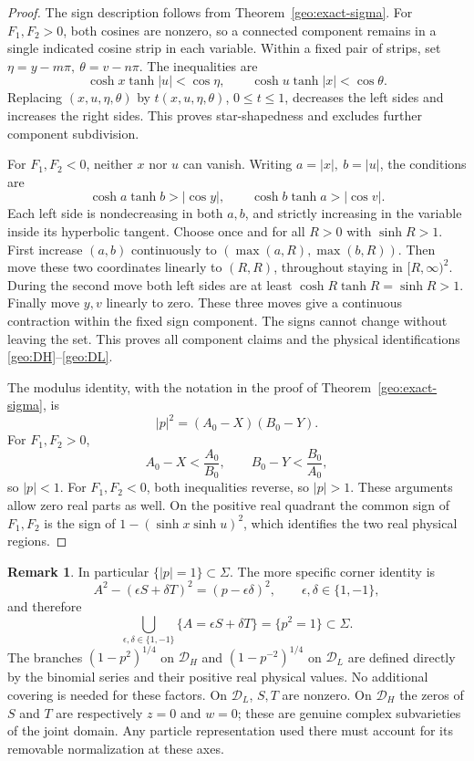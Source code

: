\documentclass[11pt]{article}
\numberwithin{equation}{section}
\theoremstyle{definition}
\newtheorem{remark}[theorem]{Remark}
\renewcommand{\DH}{\mathcal D_H}
\newcommand{\DL}{\mathcal D_L}
\begin{document}
\begin{proof}
The sign description follows from Theorem~\ref{geo:exact-sigma}.
For \(F_1,F_2>0\), both cosines are nonzero, so a connected
component remains in a single indicated cosine strip in each
variable.  Within a fixed pair of strips, set
\(\eta=y-m\pi,\ \theta=v-n\pi\).  The inequalities are
\[
 \cosh x\tanh|u|<\cos\eta,\qquad
 \cosh u\tanh|x|<\cos\theta.
\]
Replacing \((x,u,\eta,\theta)\) by
\(t(x,u,\eta,\theta)\), \(0\leq t\leq1\), decreases the
left sides and increases the right sides.  This proves
star-shapedness and excludes further component subdivision.

For \(F_1,F_2<0\), neither \(x\) nor \(u\) can vanish.
Writing \(a=|x|,\ b=|u|\), the conditions are
\[
 \cosh a\tanh b>|\cos y|,\qquad
 \cosh b\tanh a>|\cos v|.
\]
Each left side is nondecreasing in both \(a,b\), and strictly
increasing in the variable inside its hyperbolic tangent.
Choose once and for all \(R>0\) with \(\sinh R>1\).
First increase \((a,b)\) continuously to
\((\max(a,R),\max(b,R))\).  Then move these two coordinates
linearly to \((R,R)\), throughout staying in \([R,\infty)^2\).
During the second move both left sides are at least
\(\cosh R\tanh R=\sinh R>1\).  Finally move \(y,v\) linearly
to zero.  These three moves give a continuous contraction
within the fixed sign component.  The signs cannot change
without leaving the set.  This proves all component claims
and the physical identifications \eqref{geo:DH}--\eqref{geo:DL}.

The modulus identity, with the notation in the proof of
Theorem~\ref{geo:exact-sigma}, is
\begin{equation}\label{geo:p-modulus}
                  |p|^2=(A_0-X)(B_0-Y).
\end{equation}
For \(F_1,F_2>0\),
\[
 A_0-X<\frac{A_0}{B_0},\qquad
 B_0-Y<\frac{B_0}{A_0},
\]
so \(|p|<1\).  For \(F_1,F_2<0\), both inequalities reverse,
so \(|p|>1\).  These arguments allow zero real parts as well.
On the positive real quadrant the common sign of \(F_1,F_2\)
is the sign of \(1-(\sinh x\sinh u)^2\), which identifies the two
real physical regions.
\end{proof}

\begin{remark}\label{geo:algebraic-branches}
In particular \(\{|p|=1\}\subset\Sigma\).  The more specific
corner identity is
\[
 A^2-(\epsilon S+\delta T)^2=(p-\epsilon\delta)^2,
 \qquad \epsilon,\delta\in\{1,-1\},
\]
and therefore
\[
 \bigcup_{\epsilon,\delta\in\{1,-1\}}
 \{A=\epsilon S+\delta T\}=\{p^2=1\}\subset\Sigma.
\]
The branches \((1-p^2)^{1/4}\) on \(\DH\) and
\((1-p^{-2})^{1/4}\) on \(\DL\) are defined directly by the
binomial series and their positive real physical values.
No additional covering is needed for these factors.
On \(\DL\), \(S,T\) are nonzero.  On \(\DH\) the zeros of
\(S\) and \(T\) are respectively \(z=0\) and \(w=0\);
these are genuine complex subvarieties of the joint domain.
Any particle representation used there must account for
its removable normalization at these axes.
\end{remark}
\end{document}
